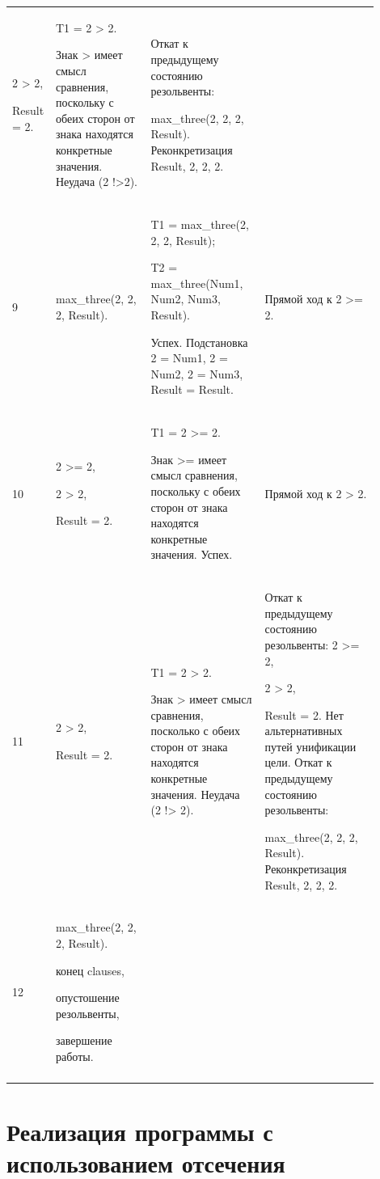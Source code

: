 \documentclass[a4paper,12pt]{article}
\begin{document}
\begin{center}
\begin{longtable}[h!]{|p{0.05\linewidth}|p{0.25\linewidth}|p{ 0.3\linewidth}|p{ 0.3\linewidth}|}
{			

		2 > 2,

	

Result = 2.} & {T1 = 2 > 2.

Знак > имеет смысл сравнения, поскольку с обеих сторон от знака находятся конкретные значения. Неудача (2 !>2).} & {Откат к предыдущему состоянию резольвенты:

max\_three(2, 2, 2, Result). Реконкретизация Result, 2, 2, 2.}\\
			{9} & {max\_three(2, 2, 2, Result).} & {T1 = max\_three(2, 2, 2, Result);
			
		T2 = max\_three(Num1, Num2, Num3, Result). 
		
		Успех. Подстановка 2 = Num1, 2 = Num2, 2 = Num3, Result = Result.} & {Прямой ход к 2 >= 2.}\\

			\hline
			{10} & {2 >= 2,
			
		2 > 2,
	
Result = 2.} & {T1 = 2 >= 2.

Знак >= имеет смысл сравнения, поскольку с обеих сторон от знака находятся конкретные значения. Успех.} & {Прямой ход к 2 > 2.}\\
			\hline
			{11} & {2 > 2,
			
		Result = 2.} & {T1 = 2 > 2.
	
 Знак > имеет смысл сравнения, посколько с обеих сторон от знака находятся конкретные значения. Неудача (2 !> 2).} & {Откат к предыдущему состоянию резольвенты: 2 >= 2,

2 > 2,

Result = 2. Нет альтернативных путей унификации цели. Откат к предыдущему состоянию резольвенты: 

max\_three(2, 2, 2, Result). Реконкретизация Result, 2, 2, 2.}\\
			\hline
			{12} & {max\_three(2, 2, 2, Result).
			
		конец clauses,
	
опустошение резольвенты,

завершение работы.} & {} & {}\\
			\hline

			\label{m2}

		\end{longtable}

	\end{center}

	

	\section*{Реализация программы с использованием отсечения}
\end{document}

